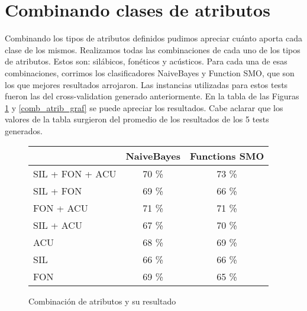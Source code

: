 \section{Combinando clases de atributos}

Combinando los tipos de atributos definidos pudimos apreciar cuánto aporta cada clase de los mismos. Realizamos todas las combinaciones de cada uno de los tipos de atributos. Estos son: silábicos, fonéticos y acústicos. Para cada una de esas combinaciones, corrimos los clasificadores NaiveBayes y Function SMO, que son los que mejores resultados arrojaron. Las instancias utilizadas para estos tests fueron las del cross-validation generado anteriormente. En la tabla de las Figuras \ref{comb_atrib} y \ref{comb_atrib_graf} se puede apreciar los resultados. Cabe aclarar que los valores de la tabla surgieron del promedio de los resultados de los 5 tests generados.  



\begin{figure}[H]
\begin{table}[H]
\centering
\begin{tabular}{|l|c|c|}
\hline
\textbf{} & \textbf{NaiveBayes} & \textbf{Functions SMO}   \\ \hline
SIL + FON + ACU & 70 \% & 73 \% \\ \hline
SIL + FON & 69 \% & 66 \% \\ \hline
FON + ACU & 71 \% & 71 \% \\ \hline
SIL + ACU & 67 \% & 70 \% \\ \hline
ACU & 68 \% & 69 \% \\ \hline
SIL & 66 \% & 66 \% \\ \hline
FON & 69 \% & 65 \% \\ \hline
\end{tabular}
\end{table}
\caption{Combinación de atributos y su resultado}
\label{comb_atrib}
\end{figure}

